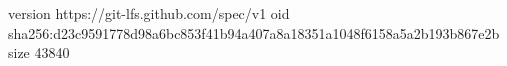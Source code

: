 version https://git-lfs.github.com/spec/v1
oid sha256:d23c9591778d98a6bc853f41b94a407a8a18351a1048f6158a5a2b193b867e2b
size 43840

